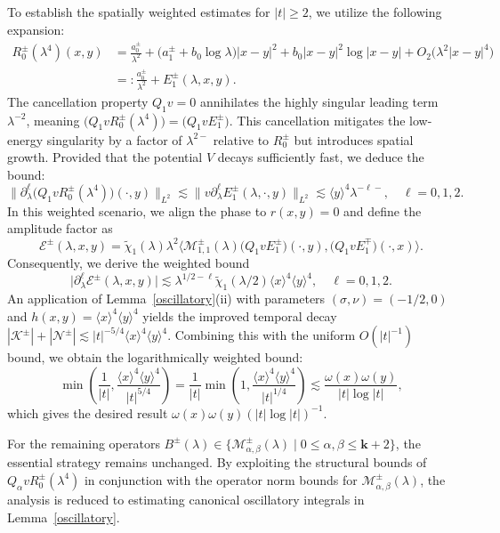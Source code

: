 \documentclass[reqno]{amsart}
\numberwithin{equation}{section}
\begin{document}
To establish the spatially weighted estimates for $|t| \ge 2$, we utilize the following expansion:
\begin{align*}
	R^\pm_0(\lambda^4)(x,y) &= \frac{a_0^\pm}{\lambda^2} + \bigl(a_1^\pm+b_0\log\lambda\bigr)|x-y|^2 + b_0|x-y|^2\log|x-y| + {O}_2\big(\lambda^2|x-y|^4\big) \nonumber \\
	&=: \frac{a_0^\pm}{\lambda^2} + E_1^\pm(\lambda, x, y).
\end{align*}
The cancellation property $Q_1 v = 0$ annihilates the highly singular leading term $\lambda^{-2}$, meaning $\bigl( Q_1 v R_0^{\pm}(\lambda^4) \bigr) = \bigl( Q_1 v E_1^{\pm} \bigr)$. This cancellation mitigates the low-energy singularity by a factor of $\lambda^{2-}$ relative to $R_0^\pm$ but introduces  spatial growth.  Provided that the potential $V$ decays sufficiently fast, we deduce the  bound:
\[
\|\partial_\lambda^\ell  \bigl(Q_1 v R_0^{\pm}(\lambda^4)\bigr)(\cdot,y)\|_{L^2}
\lesssim \|v \partial_\lambda^\ell E_1^\pm(\lambda,\cdot,y)\|_{L^2}
\lesssim \langle y\rangle^4\lambda^{-\ell-}, \quad \ell = 0, 1, 2.
\]
In this weighted scenario, we align the phase to $r(x,y)=0$ and define the amplitude factor as
$$
\mathcal{E}^\pm(\lambda,x,y)
= \widetilde{\chi}_1(\lambda) \lambda^{2}
\bigl\langle \mathcal{M}_{1,1}^\pm(\lambda) \bigl( Q_1 v E_1^{\pm} \bigr)(\cdot,y),
\bigl( Q_1 v E_1^{\mp} \bigr)(\cdot,x) \bigr\rangle.
$$
Consequently, we derive the weighted bound
\[
\bigl| \partial_\lambda^\ell \mathcal{E}^\pm(\lambda,x,y) \bigr|
\lesssim \lambda^{1/2-\ell}\widetilde{\chi}_1(\lambda/2) \langle x\rangle^{4} \langle y\rangle^{4}, \quad   \ell=0,1,2.
\]
An application of Lemma~\ref{oscillatory}(ii) with parameters $(\sigma, \nu)=(-1/2,0)$ and  $h(x,y)=\langle x\rangle^{4} \langle y\rangle^{4}$ yields the improved temporal decay $|\mathcal{K}^\pm|+|\mathcal{N}^\pm |\lesssim |t|^{-5/4}\langle x \rangle^4 \langle y \rangle^4$. Combining this with the uniform $O(|t|^{-1})$ bound, we  obtain the logarithmically weighted bound:
$$
\min\left(\frac{1}{|t|}, \frac{\langle x\rangle^4\langle y\rangle^4}{|t|^{5/4}}\right) = \frac{1}{|t|} \min\left(1, \frac{\langle x\rangle^4\langle y\rangle^4}{|t|^{1/4}}\right) \lesssim \frac{\omega(x)\omega(y)}{|t|\log|t|},
$$
which gives the desired result $\omega(x)\omega(y)(|t|\log|t|)^{-1}$.

For the remaining operators $B^\pm(\lambda) \in \{\mathcal{M}_{\alpha,\beta}^{\pm}(\lambda) \mid 0 \le \alpha,\beta \le \mathbf{k}+2\}$, the essential strategy remains unchanged. By exploiting the structural bounds of $Q_\alpha v R_0^{\pm}(\lambda^4)$ in conjunction with the operator norm bounds for $\mathcal{M}_{\alpha, \beta}^{\pm}(\lambda)$, the analysis is reduced to estimating canonical oscillatory integrals in Lemma~\ref{oscillatory}.
\end{document}
